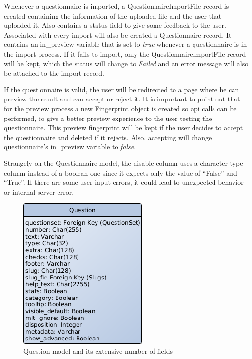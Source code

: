 Whenever a questionnaire is imported, a QuestionnaireImportFile record is created containing the information of the uploaded file and the user that uploaded it.
Also contains a status field to give some feedback to the user.
Associated with every import will also be created a Questionnaire record.
It contains an in\_preview variable that is set to \textit{true} whenever a questionnaire is in the import process.
If it fails to import, only the QuestionnaireImportFile record will be kept, which the status will change to \textit{Failed} and an error message will also be attached to the import record.

If the questionnaire is valid, the user will be redirected to a page where he can preview the result and can accept or reject it.
It is important to point out that for the preview process a new Fingerprint object is created so \gls{api} calls can be performed, to give a better preview experience to the user testing the questionnaire.
This preview fingerprint will be kept if the user decides to accept the questionnaire and deleted if it rejects.
Also, accepting will change questionnaire's in\_preview variable to \textit{false}.

Strangely on the Questionnaire model, the disable column uses a character type column instead of a boolean one since it expects only the value of ``False'' and ``True''.
If there are some user input errors, it could lead to unexpected behavior or internal server error.


\begin{figure}[h]
    \center
    \includegraphics[width=.4\textwidth]{question-model}
    \caption{Question model and its extensive number of fields}
    \label{fig:question-model}
\end{figure}

